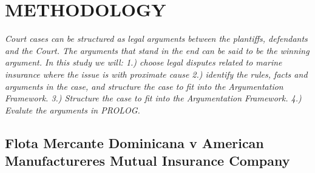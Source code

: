 \setlength{\footskip}{8mm}

\chapter{METHODOLOGY}
\label{ch:methodology}

\textit{Court cases can be structured as legal arguments between the plantiffs, defendants and the Court. The arguments that stand in the end can be said to be the winning argument.
In this study we will:  1.) choose legal disputes related to marine insurance where the issue is with proximate cause  2.) identify the rules, facts and arguments in the case, and structure the case to fit into the Argumentation Framework. 3.) Structure the case to fit into the Argumentation Framework. 4.) Evalute the arguments in PROLOG.}

\section{Flota Mercante Dominicana v American Manufactureres Mutual Insurance Company}

\newcommand{\factOne}{Plaintiff was the owner of the SS SANTO DOMINGO which burned and sank in the harbor of Santo Domingo, Dominican Republic, following shelling by members of the U.S. Armed Forces on May 4 and 5, 1965.}

\newcommand{\factTwo}{On April 24, 1965, the vessel cleared New York bound for Santo Domingo. The same day the news of the uprising in the Dominican Republic reached the ship}

\newcommand{\factThree}{According to the testimony of the ship’s captain, the broadcasts were greeted with nervous excitement by the crew. There was considerable drinking of alcoholic beverages, much hanging about the radio operator’s quarters and a general loosening of the crew’s discipline. A couple of days out of Santo Domingo, a deputation led by the first cook waited on the captain and persuaded him to permit transmission of a message sympathetic to the new constitution.}

\newcommand{\factFour}{On approaching the harbor of Santo Domingo, the captain held a meeting of the officers to discuss the question of putting into the harbor. The captain’s orders on leaving New York were to proceed to Santo Domingo, and he had received no change in those orders. He had had previous experience with navigating during revolutions, coups and uprisings in the Dominican Republic, none of which had resulted in seriously damaging consequences. Moreover, the atmosphere on ship was tense (the captain slept with a hand gun beneath his pillow), and the crew had made it clear by their behavior that they wished to enter Santo Domingo. In these circumstances, it was decided to enter the port.}

